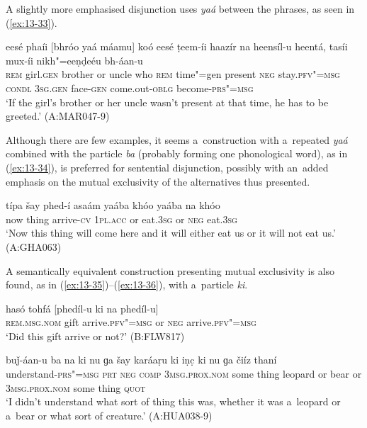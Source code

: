  A slightly more emphasised disjunction uses \textit{yaá} between the phrases, as seen in (\ref{ex:13-33}).

\begin{exe}
\ex
\label{ex:13-33}
\gll eesé phaíi [bhróo yaá máamu] koó eesé ṭeem-íi haazír na heensíl-u heentá, tasíi mux-íi nikh"=eeṇḍeéu bh-áan-u \\
\textsc{rem} girl.\textsc{gen} brother or uncle who \textsc{rem} time"=gen  present \textsc{neg} stay.\textsc{pfv"=msg} \textsc{condl} \textsc{3sg.gen} face-\textsc{gen}  come.out-\textsc{oblg} become-\textsc{prs"=msg}  \\
\glt `If the girl's brother or her uncle wasn't present at that time, he has to be greeted.' (A:MAR047-9) 
\end{exe}

 Although there are few examples, it seems a~construction with a~repeated \textit{yaá} combined with the particle \textit{ba} (probably forming one phonological word), as in (\ref{ex:13-34}), is preferred for sentential disjunction, possibly with an~added emphasis on the mutual exclusivity of the alternatives thus presented. 

\begin{exe}
\ex
\label{ex:13-34}
\gll típa šay phed-í asaám yaába khóo yaába na khóo \\
now thing arrive-\textsc{cv} \textsc{1pl.acc} or eat.\textsc{3sg} or \textsc{neg} eat.\textsc{3sg} \\
\glt `Now this thing will come here and it will either eat us or it will not eat us.' (A:GHA063) 
\end{exe}

 A semantically equivalent construction presenting mutual exclusivity is also found, as in (\ref{ex:13-35})--(\ref{ex:13-36}), with a~particle \textit{ki}. 

\begin{exe}
\ex
\label{ex:13-35}
\gll hasó tohfá [phedíl-u ki na phedíl-u] \\
\textsc{rem.msg.nom} gift arrive.\textsc{pfv"=msg} or \textsc{neg}  arrive.\textsc{pfv"=msg} \\
\glt `Did this gift arrive or not?' (B:FLW817)

\ex
\label{ex:13-36}
\gll buǰ-áan-u ba na ki nu ɡa šay karáaṛu ki iṇc̣ ki nu ɡa čiíz thaní \\
understand-\textsc{prs"=msg} \textsc{prt} \textsc{neg} \textsc{comp} \textsc{3msg.prox.nom}  some thing leopard or bear or \textsc{3msg.prox.nom} some thing \textsc{quot} \\
\glt `I didn't understand what sort of thing this was, whether it was a~leopard or a~bear or what sort of creature.' (A:HUA038-9) 
\end{exe}

